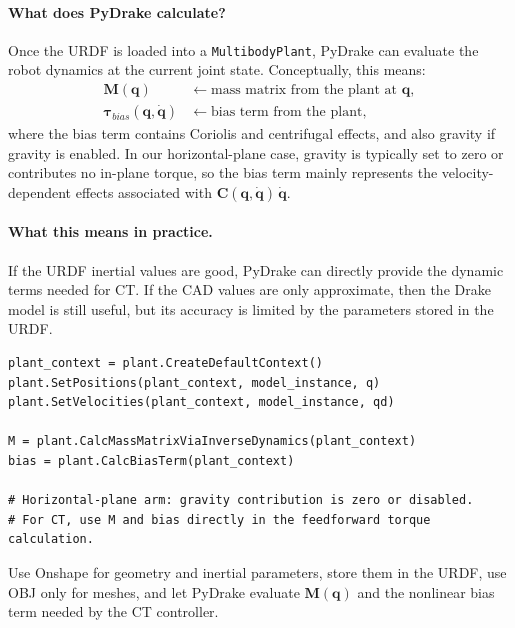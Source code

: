 \documentclass[11pt,a4paper]{article}
\newcommand{\vq}{\bm{q}}
\newcommand{\vqd}{\dot{\bm{q}}}
\newcommand{\vtau}{\bm{\tau}}
\newcommand{\M}{\bm{M}}
\newcommand{\Cor}{\bm{C}}
\begin{document}
\paragraph{What does PyDrake calculate?}
Once the URDF is loaded into a \texttt{MultibodyPlant}, PyDrake can evaluate the
robot dynamics at the current joint state.  Conceptually, this means:
\begin{align}
  \M(\vq) &\leftarrow \text{mass matrix from the plant at } \vq, \\
  \vtau_{bias}(\vq,\vqd) &\leftarrow \text{bias term from the plant},
\end{align}
where the bias term contains Coriolis and centrifugal effects, and also gravity
if gravity is enabled.  In our horizontal-plane case, gravity is typically set
to zero or contributes no in-plane torque, so the bias term mainly represents
the velocity-dependent effects associated with $\Cor(\vq,\vqd)\,\vqd$.

\paragraph{What this means in practice.}
If the URDF inertial values are good, PyDrake can directly provide the dynamic
terms needed for CT.  If the CAD values are only approximate, then the Drake
model is still useful, but its accuracy is limited by the parameters stored in
the URDF.

\begin{lstlisting}[caption={Conceptual PyDrake route to obtain the dynamic terms from a URDF model.}]
plant_context = plant.CreateDefaultContext()
plant.SetPositions(plant_context, model_instance, q)
plant.SetVelocities(plant_context, model_instance, qd)

M = plant.CalcMassMatrixViaInverseDynamics(plant_context)
bias = plant.CalcBiasTerm(plant_context)

# Horizontal-plane arm: gravity contribution is zero or disabled.
# For CT, use M and bias directly in the feedforward torque calculation.
\end{lstlisting}

\begin{resultbox}
Use Onshape for geometry and inertial parameters, store them in the URDF, use
OBJ only for meshes, and let PyDrake evaluate $\M(\vq)$ and the nonlinear bias
term needed by the CT controller.
\end{resultbox}

\end{document}
